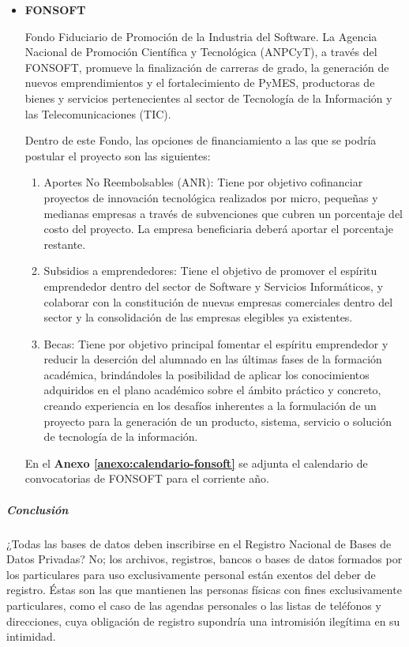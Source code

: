 \begin{itemize}
    \item \textbf{FONSOFT}
    
    Fondo Fiduciario de Promoción de la Industria del Software. La Agencia Nacional de Promoción Científica y Tecnológica (ANPCyT), a través del FONSOFT, promueve la finalización de carreras de grado, la generación de nuevos emprendimientos y el fortalecimiento de PyMES, productoras de bienes y servicios pertenecientes al sector de Tecnología de la Información y las Telecomunicaciones (TIC).
    
    Dentro de este Fondo, las opciones de financiamiento a las que se podría postular el proyecto son las siguientes:
    \begin{enumerate}
		\item Aportes No Reembolsables (ANR):
Tiene por objetivo cofinanciar proyectos de innovación tecnológica realizados por micro, pequeñas y medianas empresas a través de subvenciones que cubren un porcentaje del costo del proyecto. La empresa beneficiaria deberá aportar el porcentaje restante.
		\item Subsidios a emprendedores:
Tiene el objetivo de promover el espíritu emprendedor dentro del sector de Software y Servicios Informáticos, y colaborar con la constitución de nuevas empresas comerciales dentro del sector y la consolidación de las empresas elegibles ya existentes. 
		\item Becas:
Tiene por objetivo principal fomentar el espíritu emprendedor y reducir la deserción del alumnado en las últimas fases de la formación académica, brindándoles la posibilidad de aplicar los conocimientos adquiridos en el plano académico sobre el ámbito práctico y concreto, creando experiencia en los desafíos inherentes a la formulación de un proyecto para la generación de un producto, sistema, servicio o solución de tecnología de la información. 
	\end{enumerate}
    
    En el \textbf{Anexo \ref{anexo:calendario-fonsoft}} se adjunta el calendario de convocatorias de FONSOFT para el corriente año.

    \end{itemize}


\subparagraph{Conclusión}

¿Todas las bases de datos deben inscribirse en el Registro Nacional de Bases de Datos Privadas?
No; los archivos, registros, bancos o bases de datos formados por los particulares para uso exclusivamente personal están exentos del deber de registro.
Éstas son las que mantienen las personas físicas con fines exclusivamente particulares, como el caso de las agendas personales o las listas de teléfonos y direcciones, cuya obligación de registro supondría una intromisión ilegítima en su intimidad.

